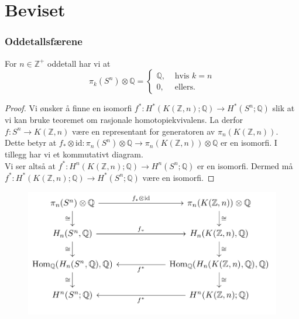 \documentclass[UKenglish]{beamer}
\begin{document}
\section{Beviset}
\SectionPage
\begin{frame}[c]
    \frametitle{Oddetallsfærene}
   \begin{theorem}[]
       For \( n\in \mathbb{Z}^+ \) oddetall har vi at
       \begin{equation}
           \pi_k(S^n)\otimes \mathbb{Q} =
           \begin{cases}
               \mathbb{Q}, &\text{ hvis } k = n\\
              0, &\text{ ellers.} 
           \end{cases}
       \end{equation}
   \end{theorem} 
\end{frame}

\begin{frame}[t, allowframebreaks]
   \begin{proof}
      Vi ønsker å finne en isomorfi \( f^*:H^*(K(\mathbb{Z}, n);\mathbb{Q})
      \rightarrow H^*(S^n; \mathbb{Q})\) slik at vi kan bruke teoremet om
      rasjonale homotopiekvivalens. La derfor \( f:S^n \rightarrow K(\mathbb{Z}, n)
    \) være en representant for generatoren av \( \pi_n(K(\mathbb{Z}, n)) \).
    Dette betyr at \( f_*\otimes\text{id}:\pi_n(S^n)\otimes\mathbb{Q}
    \rightarrow \pi_n(K(\mathbb{Z}, n))\otimes \mathbb{Q}\) er en
    isomorfi. I tillegg har vi et kommutativt diagram.\\

    Vi ser altså at \( f^*:H^n(K(\mathbb{Z}, n);\mathbb{Q})\rightarrow
    H^n(S^n;\mathbb{Q})\) er en isomorfi. Dermed må \( f^*:H^*(K(\mathbb{Z}, n);\mathbb{Q})\rightarrow H^*(S^n;\mathbb{Q}) \) være en isomorfi.

   \end{proof} 
\end{frame}

\begin{frame}[]
    
    \begin{figure}[]
        \centering
        \includegraphics[width=\textwidth]{figures/commutative.png}
    \end{figure}
\end{frame}
\end{document}
